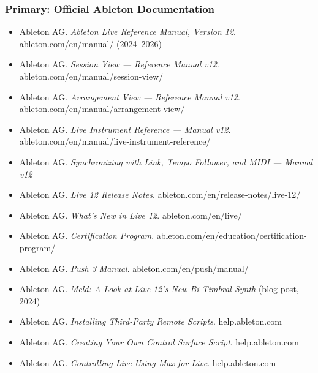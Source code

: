 \documentclass[11pt,letterpaper]{article}
\begin{document}
\subsubsection{Primary: Official Ableton Documentation}
\begin{itemize}[leftmargin=1.5em]
  \item Ableton AG. \textit{Ableton Live Reference Manual, Version 12}. ableton.com/en/manual/ (2024--2026)
  \item Ableton AG. \textit{Session View --- Reference Manual v12}. ableton.com/en/manual/session-view/
  \item Ableton AG. \textit{Arrangement View --- Reference Manual v12}. ableton.com/en/manual/arrangement-view/
  \item Ableton AG. \textit{Live Instrument Reference --- Manual v12}. ableton.com/en/manual/live-instrument-reference/
  \item Ableton AG. \textit{Synchronizing with Link, Tempo Follower, and MIDI --- Manual v12}
  \item Ableton AG. \textit{Live 12 Release Notes}. ableton.com/en/release-notes/live-12/
  \item Ableton AG. \textit{What's New in Live 12}. ableton.com/en/live/
  \item Ableton AG. \textit{Certification Program}. ableton.com/en/education/certification-program/
  \item Ableton AG. \textit{Push 3 Manual}. ableton.com/en/push/manual/
  \item Ableton AG. \textit{Meld: A Look at Live 12's New Bi-Timbral Synth} (blog post, 2024)
  \item Ableton AG. \textit{Installing Third-Party Remote Scripts}. help.ableton.com
  \item Ableton AG. \textit{Creating Your Own Control Surface Script}. help.ableton.com
  \item Ableton AG. \textit{Controlling Live Using Max for Live}. help.ableton.com
\end{itemize}
\end{document}
